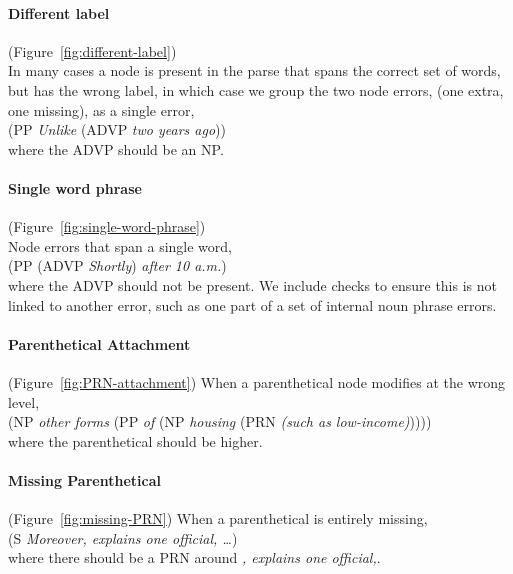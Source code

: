 \begin{figure}
\hfill
\begin{minipage}[b]{2.5in}
\centering

\end{minipage}\hfill
\begin{minipage}[b]{3.5in}
\centering

\end{minipage}\hfill
\end{figure}

\paragraph{Different label} (Figure~\ref{fig:different-label}) \\
In many cases a node is present in the parse that spans the correct set of words, but has the wrong label, in which case we group the two node errors, (one extra, one missing), as a single error, \myeg \\
(PP \emph{Unlike} (ADVP \emph{two years ago})) \\
where the ADVP should be an NP.

\paragraph{Single word phrase} (Figure~\ref{fig:single-word-phrase}) \\
Node errors that span a single word, \myeg \\
(PP (ADVP \emph{Shortly}) \emph{after 10 a.m.\@\xspace}) \\
where the ADVP should not be present.
We include checks to ensure this is not linked to another error, such as one part of a set of internal noun phrase errors.

\paragraph{Parenthetical Attachment} (Figure~\ref{fig:PRN-attachment})
When a parenthetical node modifies at the wrong level, \myeg \\
(NP \emph{other forms} (PP \emph{of} (NP \emph{housing} (PRN \emph{(such as low-income)})))) \\
where the parenthetical should be higher.

\paragraph{Missing Parenthetical} (Figure~\ref{fig:missing-PRN})
When a parenthetical is entirely missing, \myeg \\
(S \emph{Moreover, explains one official, \ldots}) \\
where there should be a PRN around \emph{, explains one official,}.

